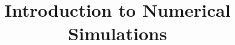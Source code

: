 \documentclass[letterpaper, 12pt, notitlepage, oneside]{report}
\begin{document}
\title{\sffamily \bfseries Introduction to Numerical Simulations}
\author{}
\date{}
\maketitle

\renewcommand{\abstractname}{\sffamily \bfseries \large Project Description}


\begin{singlespace}
\setcounter{tocdepth}{1}
{\sffamily \tableofcontents}
\end{singlespace}




\end{document}
